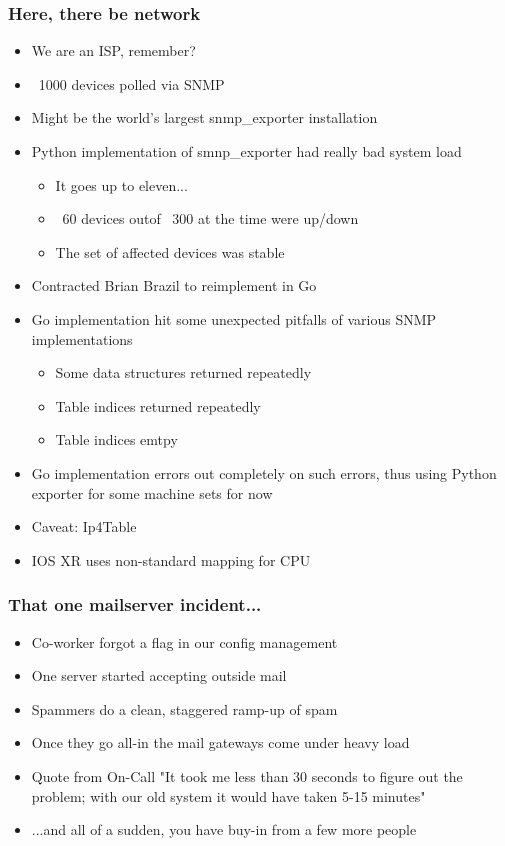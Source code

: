 \documentclass[t]{beamer}
\begin{document}
\begin{frame}
	\frametitle{Here, there be network}
	\begin{itemize}
		\item We are an ISP, remember?
		\item ~1000 devices polled via SNMP
		\item Might be the world's largest snmp\_exporter installation
		\item Python implementation of smnp\_exporter had really bad system load
		\begin{itemize}
			\item It goes up to eleven...
			\item ~60 devices outof ~300 at the time were up/down
			\item The set of affected devices was stable
		\end{itemize}
		\item Contracted Brian Brazil to reimplement in Go
		\item Go implementation hit some unexpected pitfalls of various SNMP implementations
		\begin{itemize}
			\item Some data structures returned repeatedly
			\item Table indices returned repeatedly
			\item Table indices emtpy
		\end{itemize}
		\item Go implementation errors out completely on such errors, thus using Python exporter for some machine sets for now
		\item Caveat: Ip4Table %
		\item IOS XR uses non-standard mapping for CPU %
	\end{itemize}
\end{frame}


\begin{frame}
	\frametitle{That one mailserver incident...}
	\begin{itemize}
		\item Co-worker forgot a flag in our config management
		\item One server started accepting outside mail
		\item Spammers do a clean, staggered ramp-up of spam
		\item Once they go all-in the mail gateways come under heavy load
		\item Quote from On-Call "It took me less than 30 seconds to figure out the problem; with our old system it would have taken 5-15 minutes"
		\item ...and all of a sudden, you have buy-in from a few more people
	\end{itemize}
\end{frame}
\end{document}
